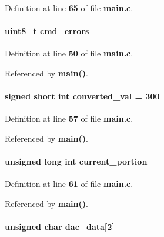 Definition at line {\bf 65} of file {\bf main.\+c}.

\paragraph[{cmd\+\_\+errors}]{\setlength{\rightskip}{0pt plus 5cm}uint8\+\_\+t cmd\+\_\+errors}\label{main_8c_ab8dfa5cb3f438a9167a95cdbfcbe12d6}


Definition at line {\bf 50} of file {\bf main.\+c}.



Referenced by {\bf main()}.

\paragraph[{converted\+\_\+val}]{\setlength{\rightskip}{0pt plus 5cm}signed short int converted\+\_\+val = 300}\label{main_8c_adb1193fb115d3bd26bb5baa555136a8f}


Definition at line {\bf 57} of file {\bf main.\+c}.



Referenced by {\bf main()}.

\paragraph[{current\+\_\+portion}]{\setlength{\rightskip}{0pt plus 5cm}unsigned long int current\+\_\+portion}\label{main_8c_a825eb5ef25c9cbf94ee0afc8680c1861}


Definition at line {\bf 61} of file {\bf main.\+c}.



Referenced by {\bf main()}.

\paragraph[{dac\+\_\+data}]{\setlength{\rightskip}{0pt plus 5cm}unsigned char dac\+\_\+data[2]}\label{main_8c_a44b6911d4c6f214779c0ece901e958f4}


